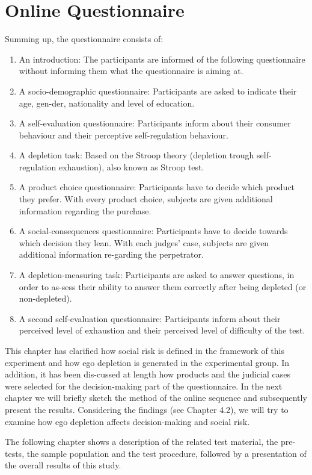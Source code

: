\section{Online Questionnaire}
Summing up, the questionnaire consists of:
\begin{enumerate}
\item An introduction: The participants are informed of the following questionnaire without informing them what the questionnaire is aiming at. 
\item A socio-demographic questionnaire: Participants are asked to indicate their age, gen-der, nationality and level of education.
\item A self-evaluation questionnaire: Participants inform about their consumer behaviour and their perceptive self-regulation behaviour.
\item A depletion task: Based on the Stroop theory (depletion trough self-regulation exhaustion), also known as Stroop test.  
\item A product choice questionnaire: Participants have to decide which product they prefer. With every product choice, subjects are given additional information regarding the purchase.
\item A social-consequences questionnaire: Participants have to decide towards which decision they lean. With each judges’ case, subjects are given additional information re-garding the perpetrator.
\item A depletion-measuring task: Participants are asked to answer questions, in order to as-sess their ability to answer them correctly after being depleted (or non-depleted).
\item A second self-evaluation questionnaire: Participants inform about their perceived level of exhaustion and their perceived level of difficulty of the test.
\end{enumerate}

This chapter has clarified how social risk is defined in the framework of this experiment and how ego depletion is generated in the experimental group.  In addition, it has been dis-cussed at length how products and the judicial cases were selected for the decision-making part of the questionnaire. In the next chapter we will briefly sketch the method of the online sequence and subsequently present the results. Considering the findings (see Chapter 4.2), we will try to examine how ego depletion affects decision-making and social risk. \par
The following chapter shows a description of the related test material, the pre-tests, the sample population and the test procedure, followed by a presentation of the overall results of this study.\par

